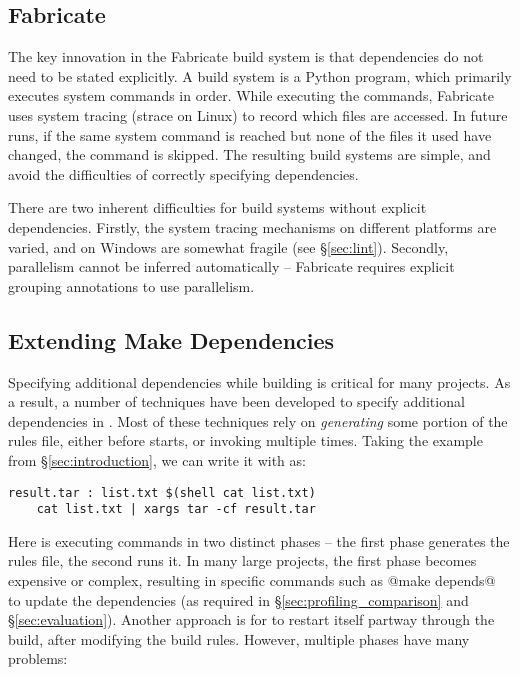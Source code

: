 \subsection{Fabricate}


The key innovation in the Fabricate build system \cite{fabricate} is that dependencies do not need to be stated explicitly. A build system is a Python program, which primarily executes system commands in order. While executing the commands, Fabricate uses system tracing (strace on Linux) to record which files are accessed. In future runs, if the same system command is reached but none of the files it used have changed, the command is skipped. The resulting build systems are simple, and avoid the difficulties of correctly specifying dependencies.

There are two inherent difficulties for build systems without explicit dependencies. Firstly, the system tracing mechanisms on different platforms are varied, and on Windows are somewhat fragile (see \S\ref{sec:lint}). Secondly, parallelism cannot be inferred automatically -- Fabricate requires explicit grouping annotations to use parallelism.

\subsection{Extending Make Dependencies}
\label{sec:make_hacks}

Specifying additional dependencies while building is critical for many projects. As a result, a number of techniques have been developed to specify additional dependencies in \make{}. Most of these techniques rely on \textit{generating} some portion of the \make{} rules file, either before \make{} starts, or invoking \make{} multiple times. Taking the example from \S\ref{sec:introduction}, we can write it with \make{} as:

\begin{verbatim}
result.tar : list.txt $(shell cat list.txt)
    cat list.txt | xargs tar -cf result.tar
\end{verbatim}

Here \make{} is executing commands in two distinct phases -- the first phase generates the rules file, the second runs it. In many large projects, the first phase becomes expensive or complex, resulting in specific commands such as @make depends@ to update the dependencies (as required in \S\ref{sec:profiling_comparison} and \S\ref{sec:evaluation}). Another approach is for \make{} to restart itself partway through the build, after modifying the build rules. However, multiple phases have many problems:

